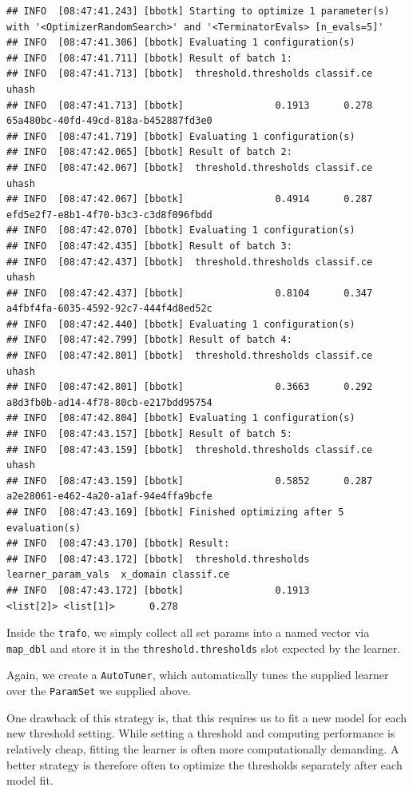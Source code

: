 \documentclass[
]{scrbook}
\begin{document}
\begin{verbatim}
## INFO  [08:47:41.243] [bbotk] Starting to optimize 1 parameter(s) with '<OptimizerRandomSearch>' and '<TerminatorEvals> [n_evals=5]' 
## INFO  [08:47:41.306] [bbotk] Evaluating 1 configuration(s) 
## INFO  [08:47:41.711] [bbotk] Result of batch 1: 
## INFO  [08:47:41.713] [bbotk]  threshold.thresholds classif.ce                                uhash 
## INFO  [08:47:41.713] [bbotk]                0.1913      0.278 65a480bc-40fd-49cd-818a-b452887fd3e0 
## INFO  [08:47:41.719] [bbotk] Evaluating 1 configuration(s) 
## INFO  [08:47:42.065] [bbotk] Result of batch 2: 
## INFO  [08:47:42.067] [bbotk]  threshold.thresholds classif.ce                                uhash 
## INFO  [08:47:42.067] [bbotk]                0.4914      0.287 efd5e2f7-e8b1-4f70-b3c3-c3d8f096fbdd 
## INFO  [08:47:42.070] [bbotk] Evaluating 1 configuration(s) 
## INFO  [08:47:42.435] [bbotk] Result of batch 3: 
## INFO  [08:47:42.437] [bbotk]  threshold.thresholds classif.ce                                uhash 
## INFO  [08:47:42.437] [bbotk]                0.8104      0.347 a4fbf4fa-6035-4592-92c7-444f4d8ed52c 
## INFO  [08:47:42.440] [bbotk] Evaluating 1 configuration(s) 
## INFO  [08:47:42.799] [bbotk] Result of batch 4: 
## INFO  [08:47:42.801] [bbotk]  threshold.thresholds classif.ce                                uhash 
## INFO  [08:47:42.801] [bbotk]                0.3663      0.292 a8d3fb0b-ad14-4f78-80cb-e217bdd95754 
## INFO  [08:47:42.804] [bbotk] Evaluating 1 configuration(s) 
## INFO  [08:47:43.157] [bbotk] Result of batch 5: 
## INFO  [08:47:43.159] [bbotk]  threshold.thresholds classif.ce                                uhash 
## INFO  [08:47:43.159] [bbotk]                0.5852      0.287 a2e28061-e462-4a20-a1af-94e4ffa9bcfe 
## INFO  [08:47:43.169] [bbotk] Finished optimizing after 5 evaluation(s) 
## INFO  [08:47:43.170] [bbotk] Result: 
## INFO  [08:47:43.172] [bbotk]  threshold.thresholds learner_param_vals  x_domain classif.ce 
## INFO  [08:47:43.172] [bbotk]                0.1913          <list[2]> <list[1]>      0.278
\end{verbatim}

Inside the \texttt{trafo}, we simply collect all set params into a named vector via \texttt{map\_dbl} and store it
in the \texttt{threshold.thresholds} slot expected by the learner.

Again, we create a \texttt{AutoTuner}, which automatically tunes the supplied learner over the \texttt{ParamSet} we supplied above.

One drawback of this strategy is, that this requires us to fit a new model for each new threshold setting.
While setting a threshold and computing performance is relatively cheap, fitting the learner is often
more computationally demanding.
A better strategy is therefore often to optimize the thresholds separately after each model fit.
\end{document}
